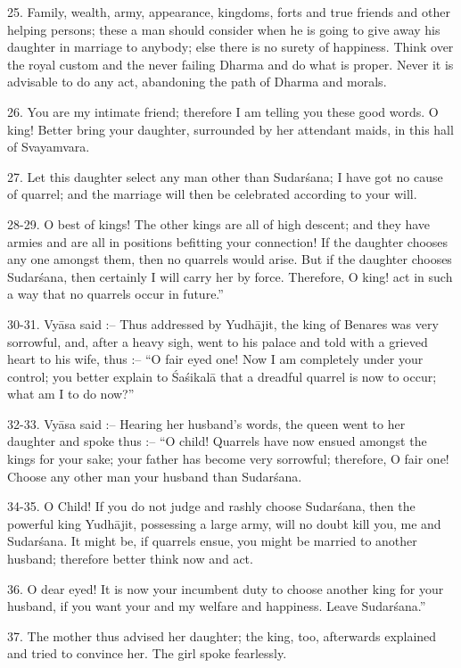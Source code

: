 25. Family, wealth, army, appearance, kingdoms, forts and true friends and other helping persons; these a man should consider when he is going to give away his daughter in marriage to anybody; else there is no surety of happiness. Think over the royal custom and the never failing Dharma and do what is proper. Never it is advisable to do any act, abandoning the path of Dharma and morals.

26. You are my intimate friend; therefore I am telling you these good words. O king! Better bring your daughter, surrounded by her attendant maids, in this hall of Svayamvara.

27. Let this daughter select any man other than Sudar\'sana; I have got no cause of quarrel; and the marriage will then be celebrated according to your will.

28-29. O best of kings! The other kings are all of high descent; and they have armies and are all in positions befitting your connection! If the daughter chooses any one amongst them, then no quarrels would arise. But if the daughter chooses Sudar\'sana, then certainly I will carry her by force. Therefore, O king! act in such a way that no quarrels occur in future.''

30-31. Vy\=asa said :-- Thus addressed by Yudh\=ajit, the king of Benares was very sorrowful, and, after a heavy sigh, went to his palace and told with a grieved heart to his wife, thus :-- ``O fair eyed one! Now I am completely under your control; you better explain to \'Sa\'sikal\=a that a dreadful quarrel is now to occur; what am I to do now?''

32-33. Vy\=asa said :-- Hearing her husband's words, the queen went to her daughter and spoke thus :-- ``O child! Quarrels have now ensued amongst the kings for your sake; your father has become very sorrowful; therefore, O fair one! Choose any other man your husband than Sudar\'sana.

34-35. O Child! If you do not judge and rashly choose Sudar\'sana, then the powerful king Yudh\=ajit, possessing a large army, will no doubt kill you, me and Sudar\'sana. It might be, if quarrels ensue, you might be married to another husband; therefore better think now and act.

36. O dear eyed! It is now your incumbent duty to choose another king for your husband, if you want your and my welfare and happiness. Leave Sudar\'sana.''

37. The mother thus advised her daughter; the king, too, afterwards explained and tried to convince her. The girl spoke fearlessly.

